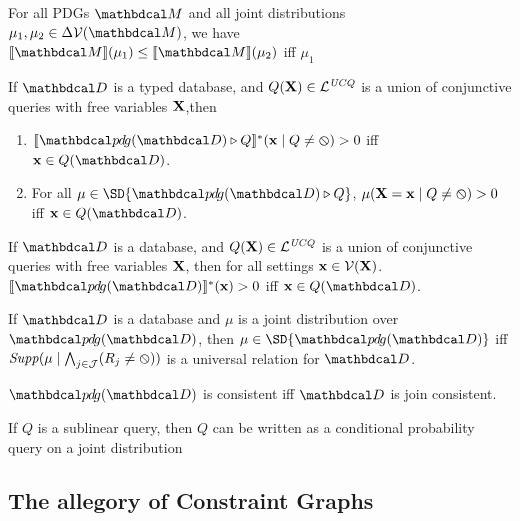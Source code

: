 \documentclass[the-pdg-manual.tex]{subfiles}
\begin{document}
\begin{inactive}
\begin{prop}
  For all PDGs $\dg M$ and all joint distributions $\mu_1, \mu_2 \in \Delta\V(\dg M)$, we have
  $\bbr{\dg M}(\mu_{1}) \le \bbr{\dg M}(\mu_{2})$ iff $\mu_{1}$
\end{prop}
\end{inactive}

\begin{prop}
  If $\D$ is a typed database, and $Q(\mathbf X) \in \mathcal L^{\mathit{UCQ}}$ is a union of conjunctive queries with free variables $\mathbf X$,then
  \begin{enumerate}[label=(\alph*)]
	\item $\bbr{\PDGof{\D} \qq Q}^{*}(\mat x \mid Q \ne \none) > 0$ iff $\mat x \in Q(\D)$.
	\item For all $\mu \in \SD{\PDGof{\D} \qq Q}$, $\mu(\mathbf X = \mathbf x \mid Q \neq\varobslash) > 0$ iff $\mat x \in Q(\D)$.
  \end{enumerate}
\end{prop}


\begin{prop}

\end{prop}

\begin{prop}
  If $\D$ is a database, and $Q(\mathbf X) \in \mathcal L^{\mathit{UCQ}}$ is a union of conjunctive queries with free variables $\mathbf X$, then
  for all settings $\mathbf x \in \mathcal V(\mathbf X)$.
  $\bbr{\PDGof{\D}}^{*}(\mat x) > 0$ iff $\mat x \in Q(\D)$.
\end{prop}


\begin{prop}
    If $\D$ is a database and $\mu$ is a joint distribution over $\PDGof{\D}$, then
    $\mu \in \SD{\PDGof{\D}}$ iff $\mathit{Supp}(\mu\mid \bigwedge_{j \in \mathcal J}( R_j \ne \varobslash)) $ is a universal relation for $\D$.
\end{prop}
\begin{coro}
    $\PDGof{\D}$ is consistent iff $\D$ is join consistent.
\end{coro}

\begin{inactive}
\begin{prop}
    If $Q$ is a sublinear query, then $Q$ can be written as a conditional probability query
    on a joint distribution
\end{prop}
\end{inactive}


\subsection{The allegory of Constraint Graphs}
\end{document}
